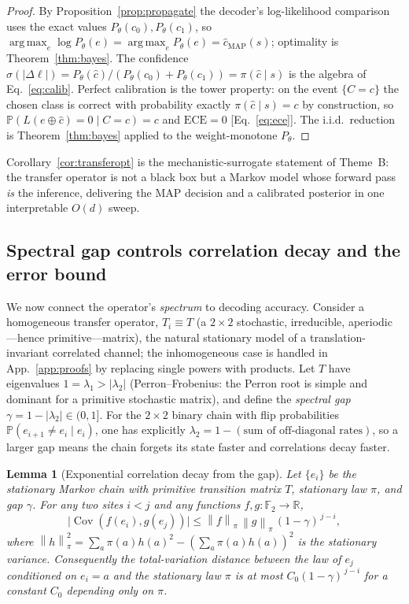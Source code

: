 \documentclass[reprint,aps,prxquantum,amsmath,amssymb,floatfix,nofootinbib,longbibliography]{revtex4-2}
\newtheorem{lemma}{Lemma}
\theoremstyle{definition}
\theoremstyle{remark}
\theoremstyle{plain}
\DeclareMathOperator*{\argmax}{arg\,max}
\newcommand{\R}{\mathbb{R}}
\newcommand{\F}{\mathbb{F}}
\newcommand{\PP}{\mathbb{P}}
\newcommand{\Cov}{\operatorname{Cov}}
\newcommand{\norm}[1]{\left\lVert #1 \right\rVert}
\newcommand{\abs}[1]{\left\lvert #1 \right\rvert}
\begin{document}
\begin{proof}
By Proposition~\ref{prop:propagate} the decoder's log-likelihood comparison
uses the exact values $P_\theta(c_0),P_\theta(c_1)$, so
$\argmax_e\log P_\theta(e)=\argmax_e P_\theta(e)=\hat c_{\mathrm{MAP}}(s)$;
optimality is Theorem~\ref{thm:bayes}. The confidence
$\sigma(\abs{\Delta\ell})=P_\theta(\hat c)/(P_\theta(c_0)+P_\theta(c_1))
=\pi(\hat c\mid s)$ is the algebra of Eq.~\eqref{eq:calib}. Perfect calibration
is the tower property: on the event $\{C=c\}$ the chosen class is correct with
probability exactly $\pi(\hat c\mid s)=c$ by construction, so
$\PP(L(e\oplus\hat c)=0\mid C=c)=c$ and $\mathrm{ECE}=0$
[Eq.~\eqref{eq:ece}]. The i.i.d.\ reduction is Theorem~\ref{thm:bayes} applied
to the weight-monotone $P_\theta$.
\end{proof}

Corollary~\ref{cor:transferopt} is the mechanistic-surrogate statement of
Theme~B: the transfer operator is not a black box but a Markov model whose
forward pass \emph{is} the inference, delivering the MAP decision and a
calibrated posterior in one interpretable $O(d)$ sweep.

\subsection{Spectral gap controls correlation decay and the error bound}
\label{sec:bayes_gap}

We now connect the operator's \emph{spectrum} to decoding accuracy. Consider a
homogeneous transfer operator, $T_i\equiv T$ (a $2\times2$ stochastic,
irreducible, aperiodic---hence primitive---matrix), the natural stationary
model of a translation-invariant correlated channel; the inhomogeneous case is
handled in App.~\ref{app:proofs} by replacing single powers with products. Let
$T$ have eigenvalues $1=\lambda_1>\abs{\lambda_2}$ (Perron--Frobenius: the
Perron root is simple and dominant for a primitive stochastic matrix), and
define the \emph{spectral gap} $\gamma=1-\abs{\lambda_2}\in(0,1]$. For the
$2\times2$ binary chain with flip probabilities $\PP(e_{i+1}\neq e_i\mid e_i)$,
one has explicitly $\lambda_2=1-(\text{sum of off-diagonal rates})$, so a
larger gap means the chain forgets its state faster and correlations decay
faster.

\begin{lemma}[Exponential correlation decay from the gap]
\label{lem:decay}
Let $\{e_i\}$ be the stationary Markov chain with primitive transition matrix
$T$, stationary law $\pi$, and gap $\gamma$. For any two sites $i<j$ and any
functions $f,g\colon\F_2\to\R$,
\begin{equation}
  \bigl|\Cov(f(e_i),g(e_j))\bigr|
   \le \norm{f}_\pi\,\norm{g}_\pi\,(1-\gamma)^{\,j-i},
  \label{eq:covdecay}
\end{equation}
where $\norm{h}_\pi^2=\sum_a\pi(a)h(a)^2-(\sum_a\pi(a)h(a))^2$ is the
stationary variance. Consequently the total-variation distance between the
law of $e_j$ conditioned on $e_i=a$ and the stationary law $\pi$ is at most
$C_0(1-\gamma)^{\,j-i}$ for a constant $C_0$ depending only on $\pi$.
\end{lemma}
\end{document}
